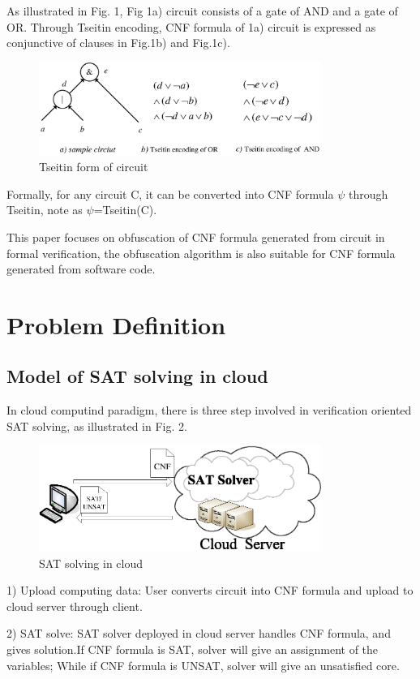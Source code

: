 \documentclass[runningheads,a4paper]{llncs}
\begin{document}
As illustrated in Fig. 1, Fig 1a) circuit consists of a gate of AND and a gate of OR.
Through Tseitin encoding, CNF formula of 1a) circuit  is expressed as conjunctive of clauses in Fig.1b) and Fig.1c).
\begin{figure}
\centering
\includegraphics[width=9.2cm]{a1}
\caption{Tseitin form of circuit}
\end{figure}
Formally, for any circuit C, it can be converted into CNF formula $\psi$ through Tseitin, note as $\psi$=Tseitin(C).

This paper focuses on obfuscation of CNF formula generated from circuit in formal verification, the obfuscation algorithm is also suitable for CNF formula generated from software code.

\section{Problem Definition}
\subsection{Model of SAT solving in cloud}

In cloud computind paradigm, there is three step involved in verification oriented SAT solving, as illustrated in Fig. 2.
\begin{figure}
\centering
\includegraphics[width=9.2cm]{a2}
\caption{SAT solving in cloud }
\end{figure}

1)  Upload computing data: User converts circuit into CNF formula and upload to cloud server through client.

2)  SAT solve: SAT solver deployed in cloud server handles CNF formula, and gives solution.If CNF formula is SAT, solver will give an assignment of the variables; While if CNF formula is UNSAT, solver will give an unsatisfied core.{}
\end{document}
